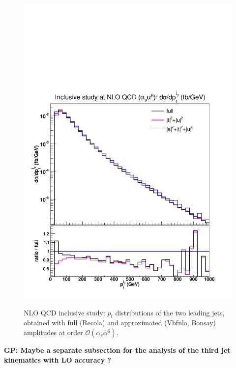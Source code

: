 \begin{figure}[hbt]
{\includegraphics[scale=0.35]{figures/scanfigures/ptj2_nlo.pdf}}
\caption{NLO QCD inclusive study: $p_t$ distributions of the two leading jets, obtained with full ({\sc Recola}) and approximated ({\sc Vbfnlo, Bonsay}) amplitudes at order $\mathcal{O}(\alpha_s\alpha^6)$.} \label{fig:mjjdyjj_1d_2}
\end{figure}


{\bf GP: Maybe a separate subsection for the analysis of the third jet kinematics with LO accuracy ?}
